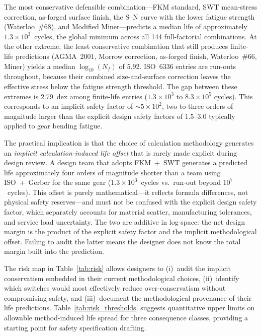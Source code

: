 \documentclass[twocolumn,12pt,a4paper]{article}
\begin{document}
The most conservative defensible combination---FKM standard, SWT
mean-stress correction, as-forged surface finish, the S--N curve with
the lower fatigue strength (Waterloo~\#68), and Modified Miner---predicts a
median life of approximately $1.3\times10^3$~cycles, the global
minimum across all 144 full-factorial combinations.
At the other extreme, the least conservative combination that still
produces finite-life predictions (AGMA~2001, Morrow correction,
as-forged finish, Waterloo~\#66, Miner) yields a median
$\log_{10}(N_f)$ of 5.92. ISO~6336 entries are run-outs throughout,
because their combined size-and-surface correction leaves the
effective stress below the fatigue strength threshold. The gap between
these extremes is 2.79~dex among finite-life entries
($1.3\times10^3$ to $8.3\times10^5$ cycles). This corresponds to an
implicit safety factor of $\sim$$5 \times 10^2$, two to three orders
of magnitude larger than the explicit design safety factors of
1.5--3.0 typically applied to gear bending fatigue.

The practical implication is that the choice of calculation methodology
generates an \emph{implicit calculation-induced life offset} that is
rarely made explicit during design review. A design team that adopts
FKM~+~SWT generates a predicted life approximately four orders of
magnitude shorter than a team using ISO~+~Gerber for the same gear
($1.3\times10^{3}$~cycles vs.\ run-out beyond $10^7$~cycles).
This offset is purely mathematical---it reflects formula differences, not
physical safety reserves---and must not be confused with the explicit
design safety factor, which separately accounts for material scatter,
manufacturing tolerances, and service load uncertainty. The two are
additive in log-space: the net design margin is the product of the
explicit safety factor and the implicit methodological offset. Failing
to audit the latter means the designer does not know the total margin
built into the prediction.

The risk map in Table~\ref{tab:risk} allows designers to (i)~audit the
implicit conservatism embedded in their current methodological choices,
(ii)~identify which switches would most effectively reduce
over-conservatism without compromising safety, and (iii)~document the
methodological provenance of their life predictions. Table~\ref{tab:risk_thresholds}
suggests quantitative upper limits on allowable method-induced
life spread for three consequence classes, providing a starting
point for safety specification drafting.
\end{document}
